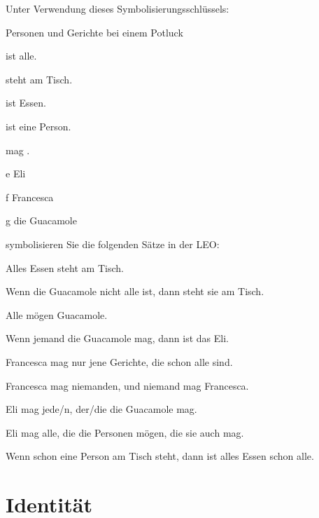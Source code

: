 \problempart
Unter Verwendung dieses Symbolisierungsschlüssels:
\begin{ekey}
\item[\text{Domäne}] Personen und Gerichte bei einem Potluck
\item[\atom{A}{x}]  ist alle.
\item[\atom{T}{x}]  steht am Tisch.
\item[\atom{E}{x}]  ist Essen.
\item[\atom{P}{x}]  ist eine Person.
\item[\atom{M}{x,y}]  mag .
\item[e] Eli
\item[f] Francesca
\item[g] die Guacamole
\end{ekey}
symbolisieren Sie die folgenden Sätze in der LEO:
\begin{earg}
\item Alles Essen steht am Tisch.
\item Wenn die Guacamole nicht alle ist, dann steht sie am Tisch.
\item Alle mögen Guacamole.
\item Wenn jemand die Guacamole mag, dann ist das Eli.
\item Francesca mag nur jene Gerichte, die schon alle sind.
\item Francesca mag niemanden, und niemand mag Francesca.
\item Eli mag jede/n, der/die die Guacamole mag.
\item Eli mag alle, die die Personen mögen, die sie auch mag.
\item Wenn schon eine Person am Tisch steht, dann ist alles Essen schon alle.
\end{earg}

\chapter{Identität}
\label{sec.identity}

